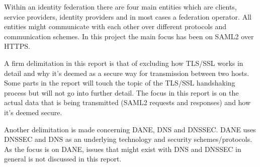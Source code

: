 Within an identity federation there are four main entities which are clients, service providers, identity providers and in most cases a federation operator.
All entities might communicate with each other over different protocols and communication schemes.
In this project the main focus has been on SAML2 over HTTPS.

A firm delimitation in this report is that of excluding how TLS/SSL works in detail and why it's deemed as a secure way for transmission between two hosts.
Some parts in the report will touch the topic of the TLS/SSL handshaking process but will not go into further detail.
The focus in this report is on the actual data that is being transmitted (SAML2 requests and responses) and how it's deemed secure. 

Another delimitation is made concerning DANE, DNS and DNSSEC.
DANE uses DNSSEC and DNS as an underlying technology and security schemes/protocols.
As the focus is on DANE, issues that might exist with DNS and DNSSEC in general is not discussed in this report.








